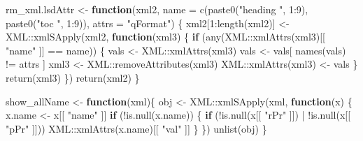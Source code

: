 \documentclass[
]{article}
\newenvironment{Shaded}{\begin{snugshade}}{\end{snugshade}}
\newcommand{\AttributeTok}[1]{\textcolor[rgb]{0.77,0.63,0.00}{#1}}
\newcommand{\ControlFlowTok}[1]{\textcolor[rgb]{0.13,0.29,0.53}{\textbf{#1}}}
\newcommand{\DecValTok}[1]{\textcolor[rgb]{0.00,0.00,0.81}{#1}}
\newcommand{\FunctionTok}[1]{\textcolor[rgb]{0.00,0.00,0.00}{#1}}
\newcommand{\NormalTok}[1]{#1}
\newcommand{\OtherTok}[1]{\textcolor[rgb]{0.56,0.35,0.01}{#1}}
\newcommand{\SpecialCharTok}[1]{\textcolor[rgb]{0.00,0.00,0.00}{#1}}
\newcommand{\StringTok}[1]{\textcolor[rgb]{0.31,0.60,0.02}{#1}}
\begin{document}
\begin{Shaded}
\begin{Highlighting}[]
\NormalTok{rm\_xml.lsdAttr }\OtherTok{\textless{}{-}} \ControlFlowTok{function}\NormalTok{(xml2,}
  \AttributeTok{name =} \FunctionTok{c}\NormalTok{(}\FunctionTok{paste0}\NormalTok{(}\StringTok{"heading "}\NormalTok{, }\DecValTok{1}\SpecialCharTok{:}\DecValTok{9}\NormalTok{), }\FunctionTok{paste0}\NormalTok{(}\StringTok{"toc "}\NormalTok{, }\DecValTok{1}\SpecialCharTok{:}\DecValTok{9}\NormalTok{)), }\AttributeTok{attrs =} \StringTok{"qFormat"}\NormalTok{)}
\NormalTok{\{}
\NormalTok{  xml2[}\DecValTok{1}\SpecialCharTok{:}\FunctionTok{length}\NormalTok{(xml2)] }\OtherTok{\textless{}{-}}\NormalTok{ XML}\SpecialCharTok{::}\FunctionTok{xmlSApply}\NormalTok{(xml2,}
    \ControlFlowTok{function}\NormalTok{(xml3) \{}
      \ControlFlowTok{if}\NormalTok{ (}\FunctionTok{any}\NormalTok{(XML}\SpecialCharTok{::}\FunctionTok{xmlAttrs}\NormalTok{(xml3)[[ }\StringTok{"name"}\NormalTok{ ]] }\SpecialCharTok{==}\NormalTok{ name)) \{}
\NormalTok{        vals }\OtherTok{\textless{}{-}}\NormalTok{ XML}\SpecialCharTok{::}\FunctionTok{xmlAttrs}\NormalTok{(xml3)}
\NormalTok{        vals }\OtherTok{\textless{}{-}}\NormalTok{ vals[ }\FunctionTok{names}\NormalTok{(vals) }\SpecialCharTok{!=}\NormalTok{ attrs ]}
\NormalTok{        xml3 }\OtherTok{\textless{}{-}}\NormalTok{ XML}\SpecialCharTok{::}\FunctionTok{removeAttributes}\NormalTok{(xml3)}
\NormalTok{        XML}\SpecialCharTok{::}\FunctionTok{xmlAttrs}\NormalTok{(xml3) }\OtherTok{\textless{}{-}}\NormalTok{ vals}
\NormalTok{      \}}
      \FunctionTok{return}\NormalTok{(xml3)}
\NormalTok{    \})}
  \FunctionTok{return}\NormalTok{(xml2)}
\NormalTok{\}}

\NormalTok{show\_allName }\OtherTok{\textless{}{-}} \ControlFlowTok{function}\NormalTok{(xml)\{}
\NormalTok{  obj }\OtherTok{\textless{}{-}}\NormalTok{ XML}\SpecialCharTok{::}\FunctionTok{xmlSApply}\NormalTok{(xml,}
    \ControlFlowTok{function}\NormalTok{(x) \{}
\NormalTok{      x.name }\OtherTok{\textless{}{-}}\NormalTok{ x[[ }\StringTok{"name"}\NormalTok{ ]]}
      \ControlFlowTok{if}\NormalTok{ (}\SpecialCharTok{!}\FunctionTok{is.null}\NormalTok{(x.name)) \{}
        \ControlFlowTok{if}\NormalTok{ (}\SpecialCharTok{!}\FunctionTok{is.null}\NormalTok{(x[[ }\StringTok{"rPr"}\NormalTok{ ]]) }\SpecialCharTok{|} \SpecialCharTok{!}\FunctionTok{is.null}\NormalTok{(x[[ }\StringTok{"pPr"}\NormalTok{ ]]))}
\NormalTok{          XML}\SpecialCharTok{::}\FunctionTok{xmlAttrs}\NormalTok{(x.name)[[ }\StringTok{"val"}\NormalTok{ ]]}
\NormalTok{      \}}
\NormalTok{    \})}
  \FunctionTok{unlist}\NormalTok{(obj)}
\NormalTok{\}}


\end{Highlighting}
\end{Shaded}
\end{document}
